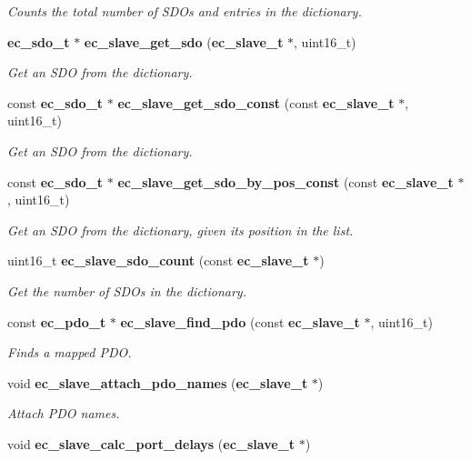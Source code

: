 \begin{DoxyCompactItemize}
\begin{DoxyCompactList}\small\item\em Counts the total number of S\-D\-Os and entries in the dictionary. \end{DoxyCompactList}\item 
{\bf ec\-\_\-sdo\-\_\-t} $\ast$ {\bf ec\-\_\-slave\-\_\-get\-\_\-sdo} ({\bf ec\-\_\-slave\-\_\-t} $\ast$, uint16\-\_\-t)
\begin{DoxyCompactList}\small\item\em Get an S\-D\-O from the dictionary. \end{DoxyCompactList}\item 
const {\bf ec\-\_\-sdo\-\_\-t} $\ast$ {\bf ec\-\_\-slave\-\_\-get\-\_\-sdo\-\_\-const} (const {\bf ec\-\_\-slave\-\_\-t} $\ast$, uint16\-\_\-t)
\begin{DoxyCompactList}\small\item\em Get an S\-D\-O from the dictionary. \end{DoxyCompactList}\item 
const {\bf ec\-\_\-sdo\-\_\-t} $\ast$ {\bf ec\-\_\-slave\-\_\-get\-\_\-sdo\-\_\-by\-\_\-pos\-\_\-const} (const {\bf ec\-\_\-slave\-\_\-t} $\ast$, uint16\-\_\-t)
\begin{DoxyCompactList}\small\item\em Get an S\-D\-O from the dictionary, given its position in the list. \end{DoxyCompactList}\item 
uint16\-\_\-t {\bf ec\-\_\-slave\-\_\-sdo\-\_\-count} (const {\bf ec\-\_\-slave\-\_\-t} $\ast$)
\begin{DoxyCompactList}\small\item\em Get the number of S\-D\-Os in the dictionary. \end{DoxyCompactList}\item 
const {\bf ec\-\_\-pdo\-\_\-t} $\ast$ {\bf ec\-\_\-slave\-\_\-find\-\_\-pdo} (const {\bf ec\-\_\-slave\-\_\-t} $\ast$, uint16\-\_\-t)
\begin{DoxyCompactList}\small\item\em Finds a mapped P\-D\-O. \end{DoxyCompactList}\item 
void {\bf ec\-\_\-slave\-\_\-attach\-\_\-pdo\-\_\-names} ({\bf ec\-\_\-slave\-\_\-t} $\ast$)\label{slave_8h_a19149abe080d35cfd2e6bd6f6bef00b1}

\begin{DoxyCompactList}\small\item\em Attach P\-D\-O names. \end{DoxyCompactList}\item 
void {\bf ec\-\_\-slave\-\_\-calc\-\_\-port\-\_\-delays} ({\bf ec\-\_\-slave\-\_\-t} $\ast$)\label{slave_8h_abe9fa7fdd6ee65108792f13eaa574d76}


\end{DoxyCompactItemize}
